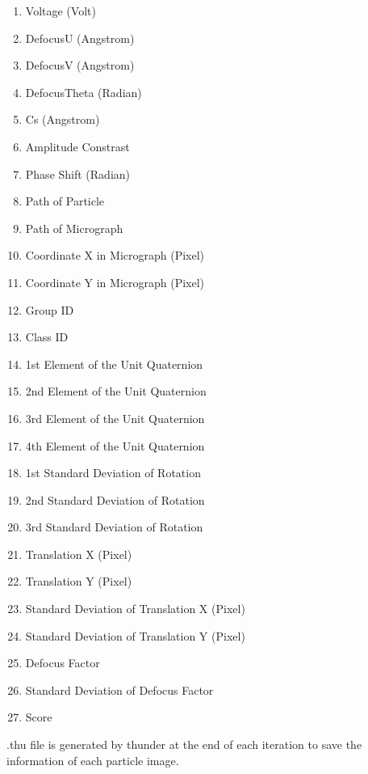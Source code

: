 \documentclass{article}
\begin{document}
            \begin{enumerate}
                \item Voltage (Volt)
                \item DefocusU (Angstrom)
                \item DefocusV (Angstrom)
                \item DefocusTheta (Radian)
                \item Cs (Angstrom)
                \item Amplitude Constrast
                \item Phase Shift (Radian)
                \item Path of Particle
                \item Path of Micrograph
                \item Coordinate X in Micrograph (Pixel)
                \item Coordinate Y in Micrograph (Pixel)
                \item Group ID
                \item Class ID
                \item 1st Element of the Unit Quaternion
                \item 2nd Element of the Unit Quaternion
                \item 3rd Element of the Unit Quaternion
                \item 4th Element of the Unit Quaternion
                \item 1st Standard Deviation of Rotation
                \item 2nd Standard Deviation of Rotation
                \item 3rd Standard Deviation of Rotation
                \item Translation X (Pixel)
                \item Translation Y (Pixel)
                \item Standard Deviation of Translation X (Pixel)
                \item Standard Deviation of Translation Y (Pixel)
                \item Defocus Factor
                \item Standard Deviation of Defocus Factor
                \item Score
            \end{enumerate}
            
            \textsf{.thu} file is generated by \textsf{thunder} at the end of each iteration to save the information of each particle image.
            
\end{document}
